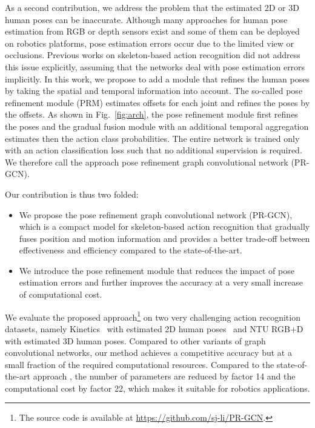 \documentclass[letterpaper, 10 pt, conference]{ieeeconf}
\begin{document}
As a second contribution, we address the problem that the estimated 2D or 3D human poses can be inaccurate. Although many approaches for human pose estimation from RGB or depth sensors exist and some of them can be deployed on robotics platforms, pose estimation errors occur due to the limited view or occlusions. Previous works on skeleton-based action recognition did not address this issue explicitly, assuming that the networks deal with pose estimation errors implicitly. In this work, we propose to add a module that refines the human poses by taking the spatial and temporal information into account. 
The so-called pose refinement module (PRM) estimates offsets for each joint and refines the poses by the offsets. As shown in Fig.~\ref{fig:arch}, the pose refinement module first refines the poses and the gradual fusion module with an additional temporal aggregation estimates then the action class probabilities. The entire network is trained only with an action classification loss such that no additional supervision is required. We therefore call the approach pose refinement graph convolutional network (PR-GCN).        







Our contribution is thus two folded:
\begin{itemize}
    \item We propose the pose refinement graph convolutional network (PR-GCN), which is a compact model for skeleton-based action recognition that gradually fuses position and motion information and provides a better trade-off between effectiveness and efficiency compared to the state-of-the-art.
    \item We introduce the pose refinement module that reduces the impact of pose estimation errors and further improves the accuracy at a very small increase of computational cost.
\end{itemize}
We evaluate the proposed approach\footnote{The source code is available at \url{https://github.com/sj-li/PR-GCN}.} on two very challenging action recognition datasets, namely Kinetics~\cite{kay2017kinetics} with estimated 2D human poses~\cite{yan2018spatial} and NTU RGB+D~\cite{shahroudy2016ntu} with estimated 3D human poses. Compared to other variants of graph convolutional networks, our method achieves a competitive accuracy but at a small fraction of the required computational resources. Compared to the state-of-the-art approach \cite{shi2019two}, the number of parameters are reduced by factor 14 and the computational cost by factor 22, which makes it suitable for robotics applications\cite{li2018direct,li2018structured,li2020multi}. 
\end{document}
